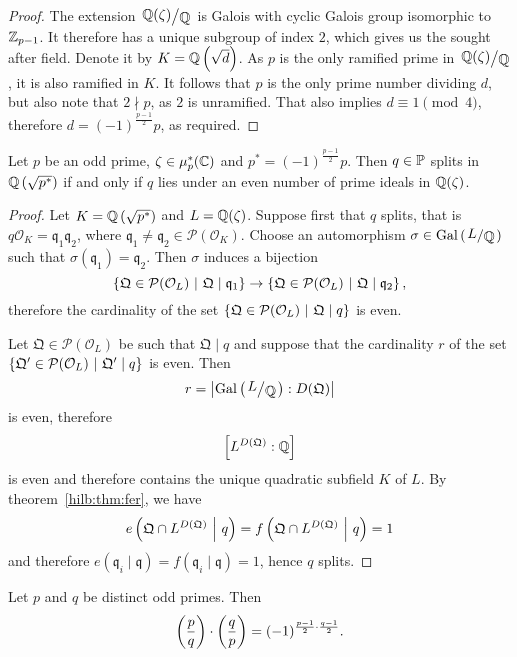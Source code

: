 \begin{proof}
The extension $\kvoc{\Q(\zeta)}{\Q}$ is Galois with cyclic Galois
group isomorphic to $\Z_{p-1}$. It therefore has a unique subgroup
of index $2$, which gives us the sought after field. Denote it by
$K = \Q \br{\sqrt{d}}$. As $p$ is the only ramified prime in
$\kvoc{\Q(\zeta)}{\Q}$, it is also ramified in $K$. It follows that
$p$ is the only prime number dividing $d$, but also note that
$2 \nmid p$, as $2$ is unramified. That also implies
$d \equiv 1 \pmod{4}$, therefore $d = (-1)^{\frac{p-1}{2}} p$, as
required.
\end{proof}

\begin{izrek}
Let $p$ be an odd prime, $\zeta \in \mu_p^*(\C)$ and
$p^* = (-1)^{\frac{p-1}{2}} p$. Then $q \in \P$ splits in
$\Q \br{\sqrt{p^*}}$ if and only if $q$ lies under an even number
of prime ideals in $\Q(\zeta)$.
\end{izrek}

\begin{proof}
Let $K = \Q \br{\sqrt{p^*}}$ and $L = \Q(\zeta)$. Suppose first
that $q$ splits, that is
$q \mathcal{O}_K = \mathfrak{q}_1 \mathfrak{q}_2$, where
$\mathfrak{q}_1 \ne \mathfrak{q}_2 \in \mathcal{P}(\mathcal{O}_K)$.
Choose an automorphism $\sigma \in \Gal \br{\kvoc{L}{\Q}}$ such
that $\sigma(\mathfrak{q}_1) = \mathfrak{q}_2$. Then $\sigma$
induces a bijection
\[
\setb{\mathfrak{Q} \in \mathcal{P}(\mathcal{O}_L)}
{\mathfrak{Q} \mid \mathfrak{q}_1} \to
\setb{\mathfrak{Q} \in \mathcal{P}(\mathcal{O}_L)}
{\mathfrak{Q} \mid \mathfrak{q}_2},
\]
therefore the cardinality of the set
$\setb{\mathfrak{Q} \in \mathcal{P}(\mathcal{O}_L)}
{\mathfrak{Q} \mid q}$
is even.

Let $\mathfrak{Q} \in \mathcal{P}(\mathcal{O}_L)$ be such that
$\mathfrak{Q} \mid q$ and suppose that the cardinality $r$ of the
set
$\setb{\mathfrak{Q}' \in \mathcal{P}(\mathcal{O}_L)}
{\mathfrak{Q}' \mid q}$
is even. Then
\[
r = \abs{\Gal \br{\kvoc{L}{\Q}} : D(\mathfrak{Q})}
\]
is even, therefore
\[
\left[L^{D(\mathfrak{Q})} : \Q\right]
\]
is even and therefore contains the unique quadratic subfield $K$ of
$L$. By theorem~\ref{hilb:thm:fer}, we have
\[
e \br{\mathfrak{Q} \cap L^{D(\mathfrak{Q})}~\middle\vert~q} =
f \br{\mathfrak{Q} \cap L^{D(\mathfrak{Q})}~\middle\vert~q} =
1
\]
and therefore
$e(\mathfrak{q}_i \mid \mathfrak{q}) =
f(\mathfrak{q}_i \mid \mathfrak{q}) =
1$, hence $q$ splits.
\end{proof}

\begin{izrek}
Let $p$ and $q$ be distinct odd primes. Then
\[
\br{\frac{p}{q}} \cdot \br{\frac{q}{p}} =
(-1)^{\frac{p-1}{2} \cdot \frac{q-1}{2}}.
\]
\end{izrek}

